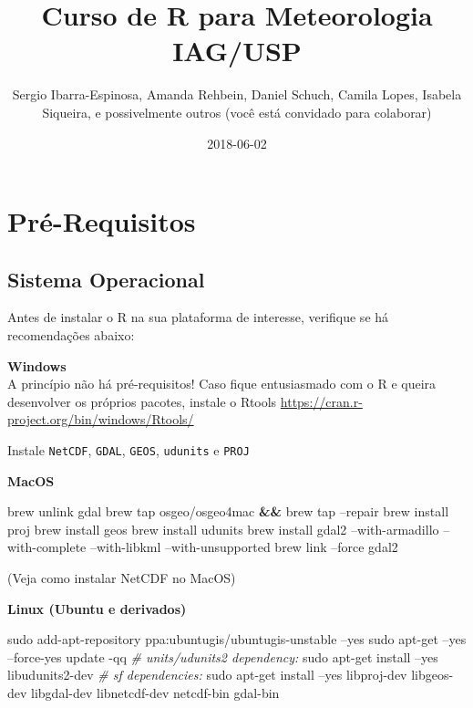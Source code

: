 \documentclass[]{book}
\title{Curso de R para Meteorologia IAG/USP}
\author{Sergio Ibarra-Espinosa, Amanda Rehbein, Daniel Schuch, Camila Lopes,
Isabela Siqueira, e possivelmente outros (você está convidado para
colaborar)}
\date{2018-06-02}
\newenvironment{Shaded}{\begin{snugshade}}{\end{snugshade}}
\newcommand{\KeywordTok}[1]{\textcolor[rgb]{0.13,0.29,0.53}{\textbf{#1}}}
\newcommand{\CommentTok}[1]{\textcolor[rgb]{0.56,0.35,0.01}{\textit{#1}}}
\newcommand{\FunctionTok}[1]{\textcolor[rgb]{0.00,0.00,0.00}{#1}}
\newcommand{\ExtensionTok}[1]{#1}
\newcommand{\NormalTok}[1]{#1}
\theoremstyle{definition}
\theoremstyle{definition}
\theoremstyle{definition}
\theoremstyle{remark}
\begin{document}
\maketitle

{
\setcounter{tocdepth}{1}
\tableofcontents
}
\chapter{Pré-Requisitos}\label{primero}

\section{Sistema Operacional}\label{sistema-operacional}

Antes de instalar o R na sua plataforma de interesse, verifique se há
recomendações abaixo:

\textbf{Windows}\\
A princípio não há pré-requisitos! Caso fique entusiasmado com o R e
queira desenvolver os próprios pacotes, instale o Rtools
\url{https://cran.r-project.org/bin/windows/Rtools/}

Instale \texttt{NetCDF}, \texttt{GDAL}, \texttt{GEOS}, \texttt{udunits}
e \texttt{PROJ}

\textbf{MacOS}

\begin{Shaded}
\begin{Highlighting}[]
\ExtensionTok{brew}\NormalTok{ unlink gdal}
\ExtensionTok{brew}\NormalTok{ tap osgeo/osgeo4mac }\KeywordTok{&&} \ExtensionTok{brew}\NormalTok{ tap --repair}
\ExtensionTok{brew}\NormalTok{ install proj}
\ExtensionTok{brew}\NormalTok{ install geos}
\ExtensionTok{brew}\NormalTok{ install udunits}
\ExtensionTok{brew}\NormalTok{ install gdal2 --with-armadillo --with-complete --with-libkml --with-unsupported}
\ExtensionTok{brew}\NormalTok{ link --force gdal2}
\end{Highlighting}
\end{Shaded}

(Veja como instalar NetCDF no MacOS)

\textbf{Linux (Ubuntu e derivados)}

\begin{Shaded}
\begin{Highlighting}[]
\FunctionTok{sudo}\NormalTok{ add-apt-repository ppa:ubuntugis/ubuntugis-unstable --yes}
\FunctionTok{sudo}\NormalTok{ apt-get --yes --force-yes update -qq}
\CommentTok{# units/udunits2 dependency:}
\FunctionTok{sudo}\NormalTok{ apt-get install --yes libudunits2-dev}
\CommentTok{# sf dependencies:}
\FunctionTok{sudo}\NormalTok{ apt-get install --yes libproj-dev libgeos-dev libgdal-dev libnetcdf-dev  netcdf-bin gdal-bin}
\end{Highlighting}
\end{Shaded}
\end{document}

